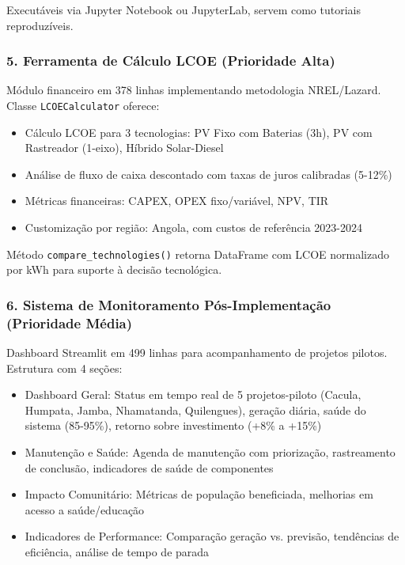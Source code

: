 \documentclass[12pt, a4paper]{article}
\begin{document}
Executáveis via Jupyter Notebook ou JupyterLab, servem como tutoriais reproduzíveis.

\subsubsection{5. Ferramenta de Cálculo LCOE (Prioridade Alta)}

Módulo financeiro em 378 linhas implementando metodologia NREL/Lazard. Classe \texttt{LCOECalculator} oferece:

\begin{itemize}
    \item Cálculo LCOE para 3 tecnologias: PV Fixo com Baterias (3h), PV com Rastreador (1-eixo), Híbrido Solar-Diesel
    \item Análise de fluxo de caixa descontado com taxas de juros calibradas (5-12\%)
    \item Métricas financeiras: CAPEX, OPEX fixo/variável, NPV, TIR
    \item Customização por região: Angola, com custos de referência 2023-2024
\end{itemize}

Método \texttt{compare\_technologies()} retorna DataFrame com LCOE normalizado por kWh para suporte à decisão tecnológica.

\subsubsection{6. Sistema de Monitoramento Pós-Implementação (Prioridade Média)}

Dashboard Streamlit em 499 linhas para acompanhamento de projetos pilotos. Estrutura com 4 seções:

\begin{itemize}
    \item Dashboard Geral: Status em tempo real de 5 projetos-piloto (Cacula, Humpata, Jamba, Nhamatanda, Quilengues), geração diária, saúde do sistema (85-95\%), retorno sobre investimento (+8\% a +15\%)
    \item Manutenção e Saúde: Agenda de manutenção com priorização, rastreamento de conclusão, indicadores de saúde de componentes
    \item Impacto Comunitário: Métricas de população beneficiada, melhorias em acesso a saúde/educação
    \item Indicadores de Performance: Comparação geração vs. previsão, tendências de eficiência, análise de tempo de parada
\end{itemize}
\end{document}
